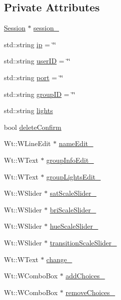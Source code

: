 \subsection*{Private Attributes}
\begin{DoxyCompactItemize}
\item 
\hyperlink{class_session}{Session} $\ast$ \hyperlink{class_single_groups_control_widget_af179b3aceb389ea2b7eb196c0cf2575d}{session\+\_\+}
\item 
std\+::string \hyperlink{class_single_groups_control_widget_a541ddd57077700f7a99ffca17636a771}{ip} = \char`\"{}\char`\"{}
\item 
std\+::string \hyperlink{class_single_groups_control_widget_a8e485f9b17c2934de11f8991a7b38bf6}{user\+ID} = \char`\"{}\char`\"{}
\item 
std\+::string \hyperlink{class_single_groups_control_widget_a6ce38d1d258028fcbefa83436ef49b5f}{port} = \char`\"{}\char`\"{}
\item 
std\+::string \hyperlink{class_single_groups_control_widget_ace03ddb209483e37c7f760fdb73baba7}{group\+ID} = \char`\"{}\char`\"{}
\item 
std\+::string \hyperlink{class_single_groups_control_widget_a0d6cf0bbd169e65cd4de29aea4a2e1b9}{lights}
\item 
bool \hyperlink{class_single_groups_control_widget_ab428d0f6a6c39724b434fc80e39c6b18}{delete\+Confirm}
\item 
Wt\+::\+W\+Line\+Edit $\ast$ \hyperlink{class_single_groups_control_widget_ab0dfc6fa2c8b3d5d2feb1858a1c3a2ef}{name\+Edit\+\_\+}
\item 
Wt\+::\+W\+Text $\ast$ \hyperlink{class_single_groups_control_widget_a2b80c0e1b05f5c1086d89512342d206f}{group\+Info\+Edit\+\_\+}
\item 
Wt\+::\+W\+Text $\ast$ \hyperlink{class_single_groups_control_widget_a0c5cd5692fc7b4be63b7732988021888}{group\+Lights\+Edit\+\_\+}
\item 
Wt\+::\+W\+Slider $\ast$ \hyperlink{class_single_groups_control_widget_ad41ed79fdff6691c6266f1a582b9962e}{sat\+Scale\+Slider\+\_\+}
\item 
Wt\+::\+W\+Slider $\ast$ \hyperlink{class_single_groups_control_widget_a761ff567fbcdc336c2b13ca9b9202478}{bri\+Scale\+Slider\+\_\+}
\item 
Wt\+::\+W\+Slider $\ast$ \hyperlink{class_single_groups_control_widget_adeb7eef1ab64cc98651ece9186e4dd68}{hue\+Scale\+Slider\+\_\+}
\item 
Wt\+::\+W\+Slider $\ast$ \hyperlink{class_single_groups_control_widget_af1811831d7031863931a9baaa97207a0}{transition\+Scale\+Slider\+\_\+}
\item 
Wt\+::\+W\+Text $\ast$ \hyperlink{class_single_groups_control_widget_a02fc84979ad2e0424a78ea3961c06a7d}{change\+\_\+}
\item 
Wt\+::\+W\+Combo\+Box $\ast$ \hyperlink{class_single_groups_control_widget_abd57b2068dc41172791d826f54dea64d}{add\+Choices\+\_\+}
\item 
Wt\+::\+W\+Combo\+Box $\ast$ \hyperlink{class_single_groups_control_widget_ad4558a087cef943d29674ec5ffd66381}{remove\+Choices\+\_\+}
\end{DoxyCompactItemize}


